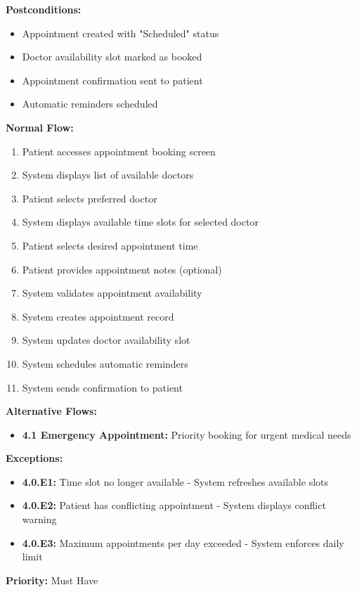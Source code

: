 \documentclass[12pt,a4paper]{article}
\begin{document}
\textbf{Postconditions:}
\begin{itemize}
    \item Appointment created with "Scheduled" status
    \item Doctor availability slot marked as booked
    \item Appointment confirmation sent to patient
    \item Automatic reminders scheduled
\end{itemize}

\textbf{Normal Flow:}
\begin{enumerate}
    \item Patient accesses appointment booking screen
    \item System displays list of available doctors
    \item Patient selects preferred doctor
    \item System displays available time slots for selected doctor
    \item Patient selects desired appointment time
    \item Patient provides appointment notes (optional)
    \item System validates appointment availability
    \item System creates appointment record
    \item System updates doctor availability slot
    \item System schedules automatic reminders
    \item System sends confirmation to patient
\end{enumerate}

\textbf{Alternative Flows:}
\begin{itemize}
    \item \textbf{4.1 Emergency Appointment:} Priority booking for urgent medical needs
\end{itemize}

\textbf{Exceptions:}
\begin{itemize}
    \item \textbf{4.0.E1:} Time slot no longer available - System refreshes available slots
    \item \textbf{4.0.E2:} Patient has conflicting appointment - System displays conflict warning
    \item \textbf{4.0.E3:} Maximum appointments per day exceeded - System enforces daily limit
\end{itemize}

\textbf{Priority:} Must Have
\end{document}
